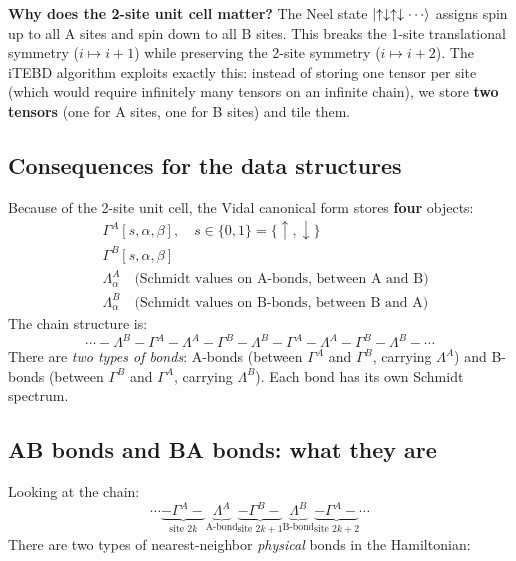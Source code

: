 \documentclass[11pt, a4paper]{article}
\begin{document}
\textbf{Why does the 2-site unit cell matter?} The Neel state $\ket{\uparrow\downarrow\uparrow\downarrow\cdots}$ assigns spin up to all A sites and spin down to all B sites. This breaks the 1-site translational symmetry ($i \mapsto i+1$) while preserving the 2-site symmetry ($i \mapsto i+2$). The iTEBD algorithm exploits exactly this: instead of storing one tensor per site (which would require infinitely many tensors on an infinite chain), we store \textbf{two tensors} (one for A sites, one for B sites) and tile them.

\subsection{Consequences for the data structures}

Because of the 2-site unit cell, the Vidal canonical form stores \textbf{four} objects:
\begin{align*}
  &\Gamma^A[s, \alpha, \beta], \quad s \in \{0, 1\} = \{\uparrow, \downarrow\} \\
  &\Gamma^B[s, \alpha, \beta] \\
  &\Lambda^A_\alpha \quad \text{(Schmidt values on A-bonds, between A and B)} \\
  &\Lambda^B_\alpha \quad \text{(Schmidt values on B-bonds, between B and A)}
\end{align*}
The chain structure is:
\begin{equation*}
  \cdots {-} \Lambda^B {-} \Gamma^A {-} \Lambda^A {-} \Gamma^B {-} \Lambda^B {-} \Gamma^A {-} \Lambda^A {-} \Gamma^B {-} \Lambda^B {-} \cdots
\end{equation*}
There are \emph{two types of bonds}: A-bonds (between $\Gamma^A$ and $\Gamma^B$, carrying $\Lambda^A$) and B-bonds (between $\Gamma^B$ and $\Gamma^A$, carrying $\Lambda^B$). Each bond has its own Schmidt spectrum.

\subsection{AB bonds and BA bonds: what they are}

Looking at the chain:
\begin{equation*}
  \cdots \underbrace{- \Gamma^A -}_{\text{site }2k} \underbrace{\Lambda^A}_{\text{A-bond}} \underbrace{- \Gamma^B -}_{\text{site }2k+1} \underbrace{\Lambda^B}_{\text{B-bond}} \underbrace{- \Gamma^A -}_{\text{site }2k+2} \cdots
\end{equation*}
There are two types of nearest-neighbor \emph{physical} bonds in the Hamiltonian:
\end{document}
